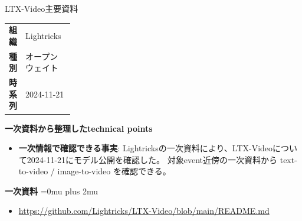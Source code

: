 \begin{technicalnote}{LTX-Video}{主要資料}
\begingroup
\begin{tabularx}{\linewidth}{@{}>{\bfseries}p{0.22\linewidth}X@{}}
組織 & Lightricks \\
種別 & オープンウェイト \\
時系列 & 2024-11-21 \\
\end{tabularx}
\smallskip
{\bfseries 一次資料から整理したtechnical points}
\begin{itemize}[leftmargin=1.5em,itemsep=0.35em]
\item \textbf{一次情報で確認できる事実}: Lightricksの一次資料により、LTX-Videoについて2024-11-21にモデル公開を確認した。 対象event近傍の一次資料から text-to-video / image-to-video を確認できる。
\end{itemize}
\begin{minipage}{\linewidth}
\begin{samepage}
{\bfseries 一次資料}
\begingroup\sloppy
\Urlmuskip=0mu plus 2mu\relax
\begin{itemize}[leftmargin=1.5em,itemsep=0.25em]
\item {\scriptsize\url{https://github.com/Lightricks/LTX-Video/blob/main/README.md}}
\end{itemize}
\endgroup
\end{samepage}
\end{minipage}
\endgroup
\end{technicalnote}
\medskip

